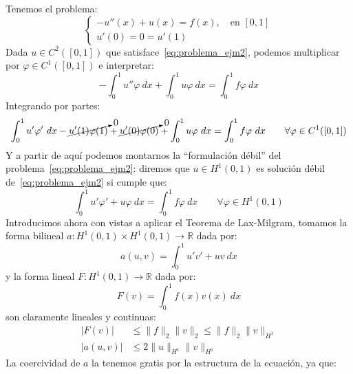 \documentclass[12pt]{book}
\begin{document}
    \begin{ejemplo}
        Tenemos el problema:
        \begin{equation}\label{eq:problema_ejm2}
            \left\{\begin{array}{l}
                    -u''(x) + u(x) = f(x), \quad \text{en\ } [0,1] \\
                    u'(0) = 0 = u'(1)
            \end{array}\right.
        \end{equation}
        Dada $u\in C^2([0,1])$ que satisface~\eqref{eq:problema_ejm2}, podemos multiplicar por $\varphi \in C^1([0,1])$ e interpretar:
        \begin{equation*}
            -\int_{0}^{1} u''\varphi~dx  + \int_{0}^{1} u\varphi~dx  = \int_{0}^{1} f\varphi~dx 
        \end{equation*}
        Integrando por partes:
        \begin{equation*}
            \int_{0}^{1} u'\varphi'~dx -\cancelto{0}{u'(1)\varphi(1)} + \cancelto{0}{u'(0)\varphi(0)} + \int_{0}^{1} u\varphi~dx  = \int_{0}^{1} f\varphi~dx  \qquad \forall \varphi \in C^1([0,1])
        \end{equation*}
        Y a partir de aquí podemos montarnos la ``formulación débil'' del problema~\eqref{eq:problema_ejm2}: diremos que $u\in H^1(0,1)$ es solución débil de~\eqref{eq:problema_ejm2} si cumple que:
        \begin{equation*}
            \int_{0}^{1} u'\varphi'+u\varphi~dx  = \int_{0}^{1} f\varphi~dx  \qquad \forall \varphi \in H^1(0,1)
        \end{equation*}
        Introducimos ahora con vistas a aplicar el Teorema de Lax-Milgram, tomamos la forma bilineal $a:H^1(0,1)\times H^1(0,1)\to\mathbb{R}$ dada por:
        \begin{equation*}
            a(u,v)=\int_{0}^{1} u'v'+uv~dx 
        \end{equation*}
        y la forma lineal $F:H^1(0,1)\to\mathbb{R}$ dada por:
        \begin{equation*}
            F(v) = \int_{0}^{1} f(x)v(x)~dx 
        \end{equation*}
        son claramente lineales y continuas:
        \begin{align*}
            |F(v)| &\leq \|f\|_2 \|v\|_2 \leq \|f\|_2 \|v\|_{H^1} \\
            |a(u,v)| &\leq 2\|u\|_{H^1}\|v\|_{H^1}
        \end{align*}
        La coercividad de $a$ la tenemos gratis por la estructura de la ecuación, ya que:

\end{ejemplo}
\end{document}

